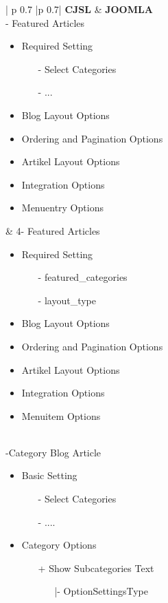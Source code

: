 \begin{minipage}{0.8\textwidth}
\begin{longtable}{| p {0.7\textwidth} |p {0.7\textwidth}|}
\hline
\textbf{CJSL} 
&  
\textbf{JOOMLA} \\ - Featured Articles
\begin{itemize}
	\item Required  Setting 
  		\begin{enumerate}
  		\item[-] Select Categories
  		\item[-] ...
		\end{enumerate}
	\item Blog Layout Options
   	\item Ordering and Pagination Options
   	\item Artikel Layout Options
   	\item Integration Options
   	\item Menuentry Options  
\end{itemize}
&
4- Featured Articles
\begin{itemize}
	\item Required  Setting 
  		\begin{enumerate}
  		\item[-] featured\_categories
  		\item[-] layout\_type
		\end{enumerate}
	\item Blog Layout Options
   	\item Ordering and Pagination Options
   	\item Artikel Layout Options
   	\item Integration Options
   	\item Menuitem Options  
\end{itemize}
\\ -Category Blog Article
\begin{itemize}
\item Basic Setting
	\begin{enumerate}
		\item[-] Select Categories
		\item[-] .... 
	 \end{enumerate}
\item Category Options
	\begin{enumerate}
		\item[+] Show Subcategories Text
			\begin{enumerate}
			\item[|-] OptionSettingsType

\end{enumerate}
\end{enumerate}
\end{itemize}
\end{longtable}
\end{minipage}
